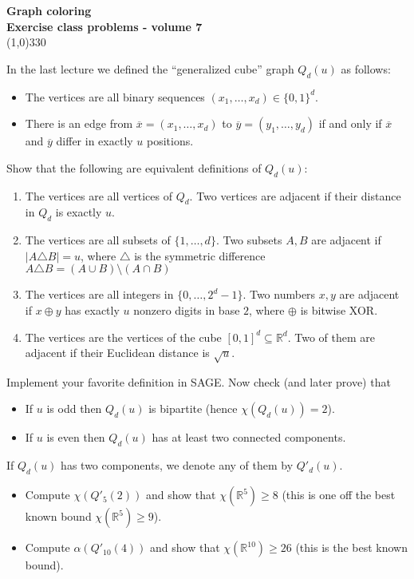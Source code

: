 \documentclass[a4paper]{article}
\newcommand{\RR}{\mathbb{R}}
\begin{document}
\pagestyle{empty}
\begin{center}
	{\Large\bf Graph coloring}\\
	{\large\bf Exercise class problems - volume 7}\\
	\line(1,0){330}
\end{center}

In the last lecture we defined the ``generalized cube'' graph $Q_d(u)$ as follows:
\begin{itemize}
\item The vertices are all binary sequences $(x_1,\ldots,x_d)\in\{0,1\}^d$. 
\item There is an edge from $\overline{x}=(x_1,\ldots,x_d)$ to $\overline{y}=(y_1,\ldots,y_d)$ if and only if $\overline{x}$ and $\overline{y}$ differ in exactly $u$ positions.
\end{itemize}

Show that the following are equivalent definitions of $Q_d(u)$:

\begin{enumerate}
\item The vertices are all vertices of $Q_d$. Two vertices are adjacent if their distance in $Q_d$ is exactly $u$.
\item The vertices are all subsets of $\{1,\ldots,d\}$. Two subsets $A,B$ are adjacent if $|A\triangle B|=u$, where $\triangle$ is the symmetric difference $A\triangle B=(A\cup B)\setminus (A\cap B)$
\item The vertices are all integers in $\{0,\ldots,2^d-1\}$. Two numbers $x,y$ are adjacent if $x\oplus y$ has exactly $u$ nonzero digits in base $2$, where $\oplus$ is bitwise XOR.
\item The vertices are the vertices of the cube $[0,1]^d\subseteq \RR^d$. Two of them are adjacent if their Euclidean distance is $\sqrt{u}$.
\end{enumerate}

Implement your favorite definition in SAGE. Now check (and later prove) that
\begin{itemize}
\item If $u$ is odd then $Q_d(u)$ is bipartite (hence $\chi(Q_d(u))=2$).
\item If $u$ is even then $Q_d(u)$ has at least two connected components.
\end{itemize}

If $Q_d(u)$ has two components, we denote any of them by $Q'_d(u)$.

\begin{itemize}
\item Compute $\chi(Q'_5(2))$ and show that $\chi(\RR^5)\geq 8$ (this is one off the best known bound $\chi(\RR^5)\geq 9$).
\item Compute $\alpha(Q'_{10}(4))$ and show that $\chi(\RR^{10})\geq 26$ (this is the best known bound). 
\end{itemize}
\end{document}
